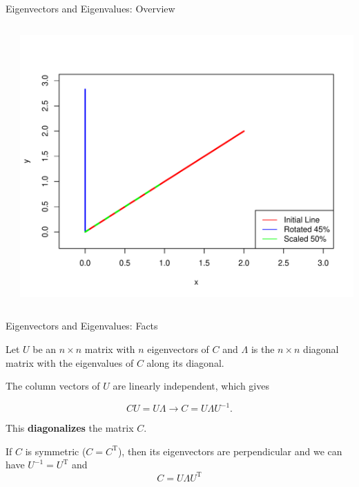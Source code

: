 \documentclass[compress,mathserif,t]{beamer} %
\begin{document}
\begin{frame}{Eigenvectors and Eigenvalues: Overview}
{\begin{columns}
\begin{column}{0.4\textwidth}
\[		\] 
	\end{column}
	\begin{column}{0.6\textwidth}\centering
		\includegraphics[width=.8\textwidth]{rotate-scale-line}
	\end{column}
\end{columns}

} 



 

\end{frame}

\begin{frame}{Eigenvectors and Eigenvalues: Facts}
	
	Let $U$ be an $n \times n$ 
	matrix with $n$ 
	eigenvectors of $C$ and $\Lambda$ is the $n 
	\times n$ diagonal matrix with the eigenvalues 
	of $C$ along its diagonal. 
	
	\vspace{.5cm}
	
	The column vectors of $U$ are 
	linearly independent, which 
	gives 
	
	\[ C U = U \Lambda \rightarrow 
	C = 
	U \Lambda U^{-1}. \]   
	
	This \textbf{diagonalizes} 
	the matrix $C$. 
	
	\vspace{.5cm}
	
	If $C$ is symmetric ($C = C^{\text{T}}$), then 
	its eigenvectors are perpendicular and we can 
	have $U^{-1} = U^{\text{T}}$ 
	and \[ C = U \Lambda 
	U^{\text{T}} \]   
	
\end{frame}
\end{document}
